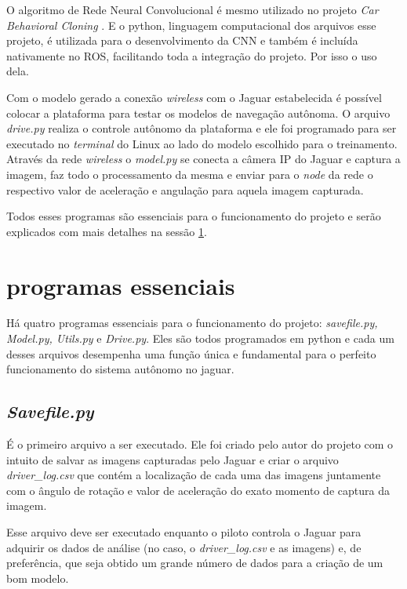 O algoritmo de Rede Neural Convolucional é mesmo utilizado no projeto \textit{Car Behavioral Cloning} \cite{naokish}. E o python, linguagem computacional dos arquivos esse projeto, é utilizada para o desenvolvimento da CNN e também é incluída nativamente no ROS, facilitando toda a integração do projeto. Por isso o uso dela.

Com o modelo gerado a conexão \textit{wireless} com o Jaguar estabelecida é possível colocar a plataforma para testar os modelos de navegação autônoma. O arquivo \textit{drive.py} realiza o controle autônomo da plataforma e ele foi programado para ser executado no \textit{terminal} do Linux ao lado do modelo escolhido para o treinamento. Através da rede \textit{wireless} o \textit{model.py} se conecta a câmera IP do Jaguar e captura a imagem, faz todo o processamento da mesma e enviar para o \textit{node} da rede o respectivo valor de aceleração e angulação para aquela imagem capturada. 

Todos esses programas são essenciais para o funcionamento do projeto e serão explicados com mais detalhes na sessão \ref{sec:programas essenciais}.


\section{programas essenciais}
\label{sec:programas essenciais}
Há quatro programas essenciais para o funcionamento do projeto: \textit{savefile.py, Model.py, Utils.py} e \textit{Drive.py}. Eles são todos programados em python e cada um desses arquivos desempenha uma função única e fundamental para o perfeito funcionamento do sistema autônomo no jaguar.

\subsection{\textit{Savefile.py}}
\label{sec:Savefile.py}

É o primeiro arquivo a ser executado. Ele foi criado pelo autor do projeto com o intuito de salvar as imagens capturadas pelo Jaguar e criar o arquivo \textit{driver\_log.csv} que contém a localização de cada uma das imagens juntamente com o ângulo de rotação e valor de aceleração do exato momento de captura da imagem. 

Esse arquivo deve ser executado enquanto o piloto controla o Jaguar para adquirir os dados de análise (no caso, o \textit{driver\_log.csv} e as imagens) e, de preferência, que seja obtido um grande número de dados para a criação de um bom modelo. 

